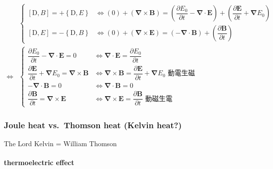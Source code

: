 \documentclass[
]{book}
\theoremstyle{definition}
\theoremstyle{definition}
\theoremstyle{definition}
\theoremstyle{definition}
\theoremstyle{remark}
\begin{document}
\begin{CJK}{UTF8}{bsmi}
$$
\begin{aligned}
 & \begin{cases}
\left[\mathrm{D},B\right]=+\left\{ \mathrm{D},E\right\}  & \Leftrightarrow\left(0\right)+\left(\boldsymbol{\nabla}\times\boldsymbol{B}\right)=\left(\dfrac{\partial E_{{\scriptscriptstyle 0}}}{\partial t}-\boldsymbol{\nabla}\cdot\boldsymbol{E}\right)+\left(\dfrac{\partial\boldsymbol{E}}{\partial t}+\boldsymbol{\nabla}E_{{\scriptscriptstyle 0}}\right)\\
\left[\mathrm{D},E\right]=-\left\{ \mathrm{D},B\right\}  & \Leftrightarrow\left(0\right)+\left(\boldsymbol{\nabla}\times\boldsymbol{E}\right)=\left(-\boldsymbol{\nabla}\cdot\boldsymbol{B}\right)+\left(\dfrac{\partial\boldsymbol{B}}{\partial t}\right)
\end{cases}\\
\Leftrightarrow & \begin{cases}
\dfrac{\partial E_{{\scriptscriptstyle 0}}}{\partial t}-\boldsymbol{\nabla}\cdot\boldsymbol{E}=0 & \Leftrightarrow\boldsymbol{\nabla}\cdot\boldsymbol{E}=\dfrac{\partial E_{{\scriptscriptstyle 0}}}{\partial t}\\
\dfrac{\partial\boldsymbol{E}}{\partial t}+\boldsymbol{\nabla}E_{{\scriptscriptstyle 0}}=\boldsymbol{\nabla}\times\boldsymbol{B} & \Leftrightarrow\boldsymbol{\nabla}\times\boldsymbol{B}=\dfrac{\partial\boldsymbol{E}}{\partial t}+\boldsymbol{\nabla}E_{{\scriptscriptstyle 0}}\text{ 動電生磁}\\
-\boldsymbol{\nabla}\cdot\boldsymbol{B}=0 & \Leftrightarrow\boldsymbol{\nabla}\cdot\boldsymbol{B}=0\\
\dfrac{\partial\boldsymbol{B}}{\partial t}=\boldsymbol{\nabla}\times\boldsymbol{E} & \Leftrightarrow\boldsymbol{\nabla}\times\boldsymbol{E}=\dfrac{\partial\boldsymbol{B}}{\partial t}\text{ 動磁生電}
\end{cases}
\end{aligned}
$$
\end{CJK}

\subsubsection{Joule heat vs.~Thomson heat (Kelvin heat?)}\label{joule-heat-vs.-thomson-heat-kelvin-heat}

The Lord Kelvin = William Thomson

\paragraph{thermoelectric effect}\label{thermoelectric-effect}
\end{document}
